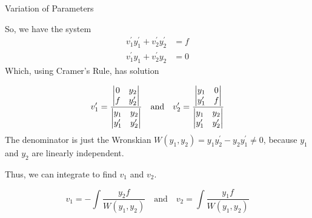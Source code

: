 \documentclass{beamer}
\begin{document}
\begin{frame}{Variation of Parameters}
\begin{block}{}
So, we have the system
\begin{equation*}
\begin{aligned}
v_1^\prime y_1^\prime + v_2^\prime y_2^\prime &=f\\
v_1^\prime y_1 + v_2^\prime y_2&=0
\end{aligned}
\end{equation*}\pause
Which, using Cramer's Rule, has solution

\vspace{-3mm}
\begin{equation*}
v_1^\prime=\dfrac{%
\begin{vmatrix}
0 & y_2        \\
f & y_2^\prime \\
\end{vmatrix}}{%
\begin{vmatrix}
y_1        & y_2        \\
y_1^\prime & y_2^\prime \\
\end{vmatrix}}
\quad\text{and}\quad
v_2^\prime=\dfrac{%
\begin{vmatrix}
y_1        & 0 \\
y_1^\prime & f \\
\end{vmatrix}}{%
\begin{vmatrix}
y_1        & y_2        \\
y_1^\prime & y_2^\prime \\
\end{vmatrix}}
\end{equation*}\pause
The denominator is just the Wronskian $W(y_1, y_2)=y_1 y_2^\prime-y_2 y_1^\prime\neq 0$, because $y_1$ and $y_2$ are linearly independent.\pause

\vspace{2mm}
Thus, we can integrate to find $v_1$ and $v_2$.

\vspace{-3mm}
\begin{equation*}
v_1=-\int\dfrac{y_2 f}{W(y_1, y_2)}
\quad\text{and}\quad
v_2=\int\dfrac{y_1 f}{W(y_1, y_2)}
\end{equation*}
\end{block}
\end{frame}
\end{document}
